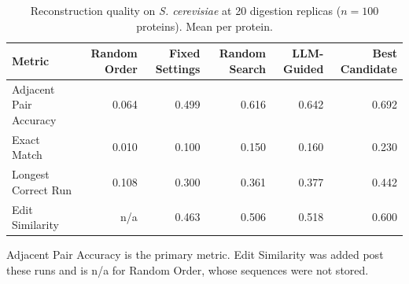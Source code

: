 \begin{table}[!tb]
  \centering
  \caption{Reconstruction quality on \textnormal{\textnormal{\textit{S. cerevisiae}}} at 20 digestion replicas ($n=100$ proteins). Mean per protein.}
  \label{tab:main_results_yeast_r20}
  \begin{tabular}{lrrrrr}
    \toprule
    Metric & Random Order & Fixed Settings & Random Search & LLM-Guided & Best Candidate \\
    \midrule
    Adjacent Pair Accuracy & 0.064 & 0.499 & 0.616 & 0.642 & 0.692 \\
    Exact Match & 0.010 & 0.100 & 0.150 & 0.160 & 0.230 \\
    Longest Correct Run & 0.108 & 0.300 & 0.361 & 0.377 & 0.442 \\
    Edit Similarity & n/a & 0.463 & 0.506 & 0.518 & 0.600 \\
    \bottomrule
  \end{tabular}
  \par\smallskip\footnotesize{Adjacent Pair Accuracy is the primary metric. Edit Similarity was added post these runs and is n/a for Random Order, whose sequences were not stored.}
\end{table}
